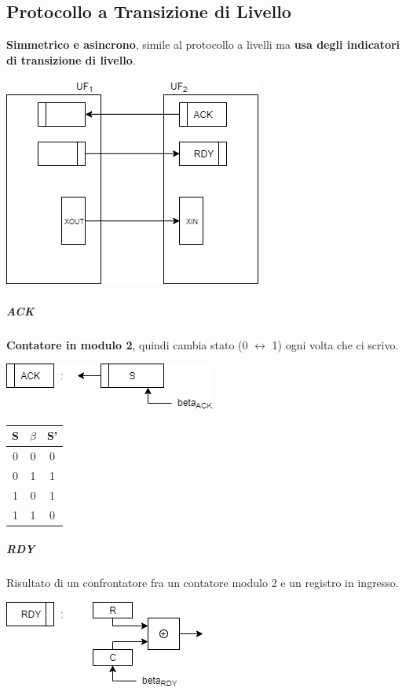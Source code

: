 \documentclass[10pt]{report}
\begin{document}
\subsection{Protocollo a Transizione di Livello}
\textbf{Simmetrico e asincrono}, simile al protocollo a livelli ma \textbf{usa degli indicatori di transizione di livello}.
\begin{center}
\includegraphics[scale=0.7]{uftransliv.png}
\end{center}
\subparagraph{ACK} \textbf{Contatore in modulo 2}, quindi cambia stato (0 $\leftrightarrow$ 1) ogni volta che ci scrivo.
\begin{multicols}{2}
\includegraphics[scale=1]{ack.png}
\begin{center}
\begin{tabular}{ c c | c }
			 S & $\beta$ & S' \\
			 \hline
			 0 & 0 & 0 \\
			 0 & 1 & 1 \\
			 1 & 0 & 1 \\
			 1 & 1 & 0
\end{tabular}
\end{center}
\end{multicols}
\subparagraph{RDY} Risultato di un confrontatore fra un contatore modulo 2 e un registro in ingresso.
\begin{multicols}{2}
\includegraphics[scale=1]{rdy.png}
\end{multicols}
\end{document}
